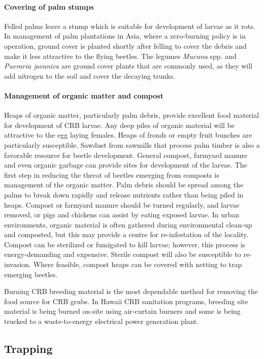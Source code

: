 \documentclass[twocolumn,letterpaper]{scrartcl}
\begin{document}
\paragraph{Covering of palm stumps}
Felled palms leave a stump which is suitable for development of larvae as it rots. In management of palm plantations in Asia, where a zero-burning policy is in operation, ground cover is planted shortly after felling to cover the debris and make it less attractive to the flying beetles. The legumes \textit{Mucuna} spp. and \textit{Pueraria javanica} are ground cover plants that are commonly used, as they will add nitrogen to the soil and cover the decaying trunks. 

\paragraph{Management of organic matter and compost}
Heaps  of  organic  matter,  particularly  palm  debris,  provide  excellent  food  material  for  development  of  CRB larvae. Any deep piles of organic material will be attractive to the egg laying females. Heaps of fronds or empty fruit bunches are particularly susceptible. Sawdust from sawmills that process palm timber is also a favorable resource for beetle development. General compost, farmyard manure and even organic garbage can provide sites for development of the larvae. The first step in reducing the threat of beetles emerging from composts is management of the organic matter. Palm debris should be spread among the palms to break down rapidly and release nutrients rather than being piled in heaps. Compost or farmyard manure should be turned regularly, and larvae removed, or pigs and chickens can assist by eating exposed larvae. In urban environments, organic material is often gathered during environmental clean-up and composted, but this may provide a centre for re-infestation of the locality. Compost can be sterilized or fumigated to kill larvae; however, this process is energy-demanding  and  expensive.  Sterile  compost  will  also  be  susceptible  to  re-invasion. Where  feasible,  compost heaps can be covered with netting to trap emerging beetles.

Burning CRB breeding material is the most dependable method for removing the food source for CRB grubs. In Hawaii CRB sanitation programs, breeding site material is being burned on-site using air-curtain burners and some is being trucked to a waste-to-energy electrical power generation plant. 

\subsection{Trapping}
\end{document}

